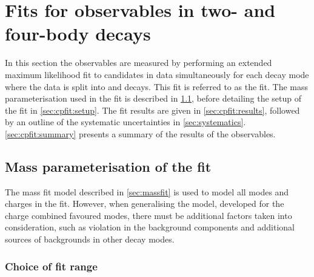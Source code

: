 \clearpage
%

\chapter{\label{ch:5-cpfit}Fits for \CP observables in two- and four-body decays} 


In this section the \CP observables are measured by performing an extended maximum likelihood fit to \btodkst candidates in data simultaneously for each \Dz decay mode where the data is split into \Bp and \Bm decays. This fit is referred to as the \CP fit. The mass parameterisation used in the \CP fit is described in \sect\ref{sec:cpfit:model}, before detailing the setup of the \CP fit in \sect\ref{sec:cpfit:setup}. The \CP fit results are given in \sect\ref{sec:cpfit:results}, followed by an outline of the systematic uncertainties in \sect\ref{sec:systematics}. \Sect\ref{sec:cpfit:summary} presents a summary of the results of the \CP observables.

\section{Mass parameterisation of the \CP fit}
\label{sec:cpfit:model}

The mass fit model described in \sect\ref{sec:massfit} is used to model all \Dz modes and \B charges in the \CP fit. However, when generalising the model, developed for the charge combined favoured modes, there must be additional factors taken into consideration, such as \CP violation in the background components and additional sources of backgrounds in other \Dz decay modes.

\subsection{Choice of fit range}
\label{sec:cpfit:range}	

